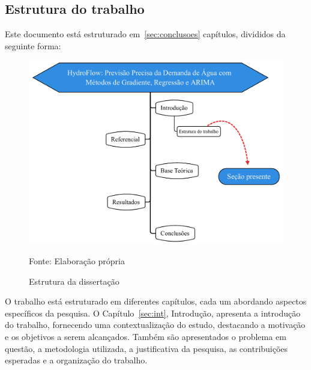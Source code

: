 \subsection{Estrutura do trabalho} \label{subsec:estrutura}

 Este documento está estruturado em~\ref{sec:conclusoes} capítulos, divididos da seguinte forma:
   
    \begin{figure}[H]
    	\centering
    	\caption{Estrutura da dissertação}
    	\label{fig:estrutura}
    	\includegraphics[width=0.9\linewidth]{Introducao/Figuras/Estrutura}
    	
    	Fonte: Elaboração própria 
    \end{figure}

O trabalho está estruturado em diferentes capítulos, cada um abordando aspectos específicos da pesquisa. O Capítulo~\ref{sec:int}, Introdução, apresenta a introdução do trabalho, fornecendo uma contextualização do estudo, destacando a motivação e os objetivos a serem alcançados. Também são apresentados o problema em questão, a metodologia utilizada, a justificativa da pesquisa, as contribuições esperadas e a organização do trabalho.

